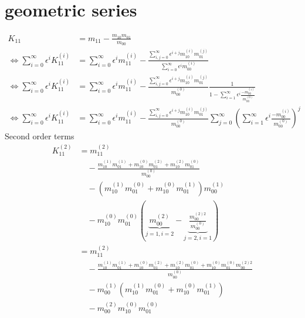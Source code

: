 \documentclass{article}
\begin{document}
\section{geometric series}
\label{sec:geometric series}
\begin{equation}
  \begin{aligned}
    K_{11} & = m_{11} - \frac{m_{10}m_{01}}{m_{00}}\\
    \Leftrightarrow
    \sum_{i=0}^\infty \epsilon^i K_{11}^{(i)}
    & = \sum_{i=0}^\infty \epsilon^i m_{11}^{(i)} -
    \frac{\sum_{i,j=0}^\infty \epsilon^{i+j} m_{10}^{(i)}m_{01}^{(j)}}
        {\sum_{i=0}^\infty \epsilon^i m_{00}^{(i)}}\\
    \Leftrightarrow
    \sum_{i=0}^\infty \epsilon^i K_{11}^{(i)}
    & = \sum_{i=0}^\infty \epsilon^i m_{11}^{(i)} -
    \frac{\sum_{i,j=0}^\infty \epsilon^{i+j} m_{10}^{(i)}m_{01}^{(j)}}
        {m_{00}^{(0)}}
        \frac{1}{1 - \sum_{i=1}^\infty \epsilon^i \frac{ - m_{00}^{(i)}}{ m_{00}^{(0)}}}\\
    \Leftrightarrow
    \sum_{i=0}^\infty \epsilon^i K_{11}^{(i)}
    & = \sum_{i=0}^\infty \epsilon^i m_{11}^{(i)} -
    \frac{\sum_{i,j=0}^\infty \epsilon^{i+j} m_{10}^{(i)}m_{01}^{(j)}}
        {m_{00}^{(0)}}
    \sum_{j=0}^\infty {\left(\sum_{i=1}^\infty \epsilon^i \frac{ - m_{00}^{(i)}}{ m_{00}^{(0)}}\right)}^j
  \end{aligned}
\end{equation}
Second order terms
\begin{equation}
  \begin{aligned}
    K_{11}^{(2)}
    &= m_{11}^{(2)} \\
    &\quad-
    \frac{
      m_{10}^{(1)}m_{01}^{(1)}
    + m_{10}^{(0)}m_{01}^{(2)}
    + m_{10}^{(2)}m_{01}^{(0)}
    }{m_{00}^{(0)}}\\
    &\quad
    -(m_{10}^{(1)}m_{01}^{(0)} + m_{10}^{(0)}m_{01}^{(1)}) m_{00}^{(1)}\\
    &\quad
    - m_{10}^{(0)}m_{01}^{(0)}
    \left(
      \underbrace{m_{00}^{(2)}}_{j=1,i=2}
      - \underbrace{\frac{m_{00}^{(2)2}}{m_{00}^{(0)}}}_{j=2,i=1}
    \right)\\
    &= m_{11}^{(2)} \\
    &\quad-
    \frac{
      m_{10}^{(1)}m_{01}^{(1)}
    + m_{10}^{(0)}m_{01}^{(2)}
    + m_{10}^{(2)}m_{01}^{(0)}
    + m_{10}^{(0)}m_{01}^{(0)}m_{00}^{(2)2}
    }{m_{00}^{(0)}}\\
    &\quad
    - m_{00}^{(1)}(m_{10}^{(1)}m_{01}^{(0)} + m_{10}^{(0)}m_{01}^{(1)}) \\
    &\quad
    - m_{00}^{(2)}m_{10}^{(0)}m_{01}^{(0)}
  \end{aligned}
\end{equation}
\end{document}
